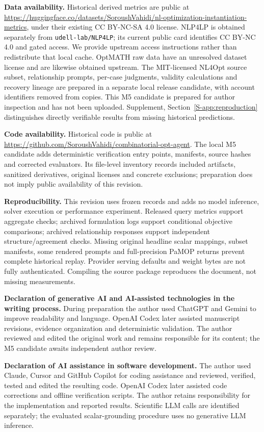 \documentclass[pdflatex,sn-basic,Numbered]{sn-jnl}
\begin{document}
\noindent\textbf{Data availability.} Historical derived metrics are public at \url{https://huggingface.co/datasets/SoroushVahidi/nl-optimization-instantiation-metrics}, under their existing CC BY-NC-SA 4.0 license. NLP4LP is obtained separately from \texttt{udell-lab/NLP4LP}; its current public card identifies CC BY-NC 4.0 and gated access. We provide upstream access instructions rather than redistribute that local cache. OptMATH raw data have an unresolved dataset license and are likewise obtained upstream. The MIT-licensed NL4Opt source subset, relationship prompts, per-case judgments, validity calculations and recovery lineage are prepared in a separate local release candidate, with account identifiers removed from copies. This M5 candidate is prepared for author inspection and has not been uploaded. Supplement, Section~\ref{S-app:reproduction} distinguishes directly verifiable results from missing historical predictions.

\noindent\textbf{Code availability.} Historical code is public at \url{https://github.com/SoroushVahidi/combinatorial-opt-agent}. The local M5 candidate adds deterministic verification entry points, manifests, source hashes and corrected evaluators. Its file-level inventory records included artifacts, sanitized derivatives, original licenses and concrete exclusions; preparation does not imply public availability of this revision.

\noindent\textbf{Reproducibility.} This revision uses frozen records and adds no model inference, solver execution or performance experiment. Released query metrics support aggregate checks; archived formulation logs support conditional objective comparisons; archived relationship responses support independent structure/agreement checks. Missing original headline scalar mappings, subset manifests, some rendered prompts and full-precision PaMOP returns prevent complete historical replay. Provider serving defaults and weight bytes are not fully authenticated. Compiling the source package reproduces the document, not missing measurements.

\noindent\textbf{Declaration of generative AI and AI-assisted technologies in the writing process.} During preparation the author used ChatGPT and Gemini to improve readability and language. OpenAI Codex later assisted manuscript revisions, evidence organization and deterministic validation. The author reviewed and edited the original work and remains responsible for its content; the M5 candidate awaits independent author review.

\noindent\textbf{Declaration of AI assistance in software development.} The author used Claude, Cursor and GitHub Copilot for coding assistance and reviewed, verified, tested and edited the resulting code. OpenAI Codex later assisted code corrections and offline verification scripts. The author retains responsibility for the implementation and reported results. Scientific LLM calls are identified separately; the evaluated scalar-grounding procedure uses no generative LLM inference.


\end{document}
